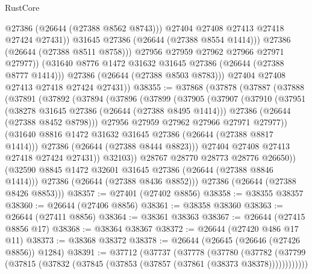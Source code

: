\begin{lexlean}{RustCore}
\begin{coremodule}
                        @27386
                        (@26644 (@27388 @8562 @8743)))
                      @27404
                      @27408
                      @27413
                      @27418
                      @27424
                      @27431))
                  @31645
                  @27386
                  (@26644 (@27388 @8554 @1414)))
                @27386
                (@26644 (@27388 @8511 @8758)))
              @27956
              @27959
              @27962
              @27966
              @27971
              @27977))
          (@31640 @8776 @1472 @31632 @31645 @27386 (@26644 (@27388 @8777 @1414)))
          @27386
          (@26644 (@27388 @8503 @8783)))
        @27404
        @27408
        @27413
        @27418
        @27424
        @27431))
@38355 := @37868
    (@37878
      (@37887
        (@37888
          (@37891
            (@37892
              (@37894
                (@37896
                  (@37899
                    (@37905
                      (@37907
                        (@37910
                          (@37951
                            (@38278 @31645 @27386 (@26644 (@27388 @8495 @1414)))
                            @27386
                            (@26644 (@27388 @8452 @8798)))
                          @27956
                          @27959
                          @27962
                          @27966
                          @27971
                          @27977))
                      (@31640 @8816 @1472 @31632 @31645 @27386 (@26644 (@27388 @8817 @1414)))
                      @27386
                      (@26644 (@27388 @8444 @8823)))
                    @27404
                    @27408
                    @27413
                    @27418
                    @27424
                    @27431))
                @32103))
            @28767
            @28770
            @28773
            @28776
            @26650))
        (@32590 @8845 @1472 @32601 @31645 @27386 (@26644 (@27388 @8846 @1414)))
        @27386
        (@26644 (@27388 @8436 @8852)))
      @27386
      (@26644 (@27388 @8426 @8853)))
@38357 := @27401 (@27402 @8856)
@38358 := @38355 @38357
@38360 := @26644 (@27406 @8856)
@38361 := @38358 @38360
@38363 := @26644 (@27411 @8856)
@38364 := @38361 @38363
@38367 := @26644 (@27415 @8856 @17)
@38368 := @38364 @38367
@38372 := @26644 (@27420 @486 @17 @11)
@38373 := @38368 @38372
@38378 := @26644 (@26645 (@26646 (@27426 @8856)) @1284)
@38391 := @37712
    (@37737
      (@37778
        (@37780
          (@37782 (@37799 (@37815 (@37832 (@37845 (@37853 (@37857 (@37861 (@38373 @38378))))))))))))

\end{coremodule}
\end{lexlean}
